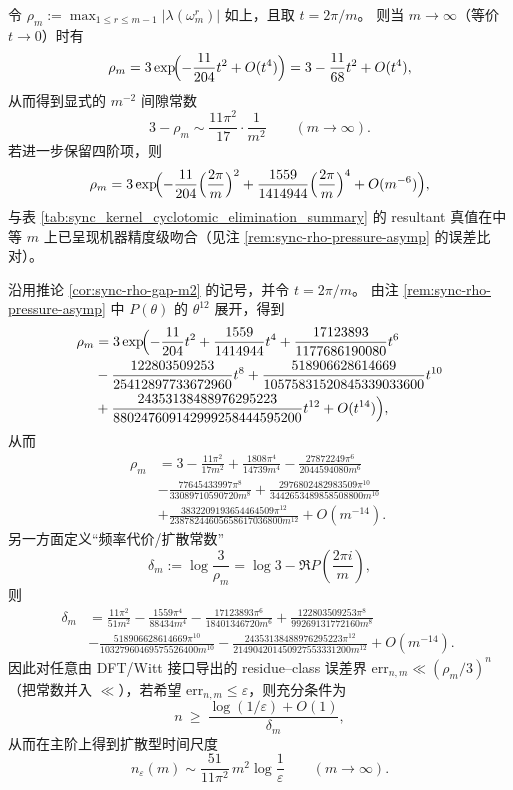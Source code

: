 \begin{corollary}\label{cor:sync-rho-gap-m2}
令 \(\rho_m:=\max_{1\le r\le m-1}|\lambda(\omega_m^r)|\) 如上，且取 \(t=2\pi/m\)。
则当 \(m\to\infty\)（等价 \(t\to 0\)）时有
\[
\rho_m
=3\exp\!\Bigl(-\frac{11}{204}t^2+O(t^4)\Bigr)
=3-\frac{11}{68}t^2+O(t^4),
\]
从而得到显式的 \(m^{-2}\) 间隙常数
\[
\boxed{\;
3-\rho_m\sim \frac{11\pi^2}{17}\cdot\frac{1}{m^2}\qquad(m\to\infty).
\;}
\]
若进一步保留四阶项，则
\[
\rho_m
=3\exp\!\Bigl(-\frac{11}{204}\Bigl(\frac{2\pi}{m}\Bigr)^2+\frac{1559}{1414944}\Bigl(\frac{2\pi}{m}\Bigr)^4+O(m^{-6})\Bigr),
\]
与表 \ref{tab:sync_kernel_cyclotomic_elimination_summary} 的 resultant 真值在中等 \(m\) 上已呈现机器精度级吻合（见注 \ref{rem:sync-rho-pressure-asymp} 的误差比对）。
\end{corollary}

\begin{corollary}\label{cor:sync-rho-gap-m8-diffusive}
沿用推论 \ref{cor:sync-rho-gap-m2} 的记号，并令 \(t=2\pi/m\)。
由注 \ref{rem:sync-rho-pressure-asymp} 中 \(P(\theta)\) 的 \(\theta^{12}\) 展开，得到
\[
\begin{aligned}
\rho_m
&=3\exp\!\Bigl(-\frac{11}{204}t^2+\frac{1559}{1414944}t^4+\frac{17123893}{1177686190080}t^6\\
&-\frac{122803509253}{25412897733672960}t^8+\frac{518906628614669}{10575831520845339033600}t^{10}\\
&+\frac{24353138488976295223}{880247609142999258444595200}t^{12}+O(t^{14})\Bigr),
\end{aligned}
\]
从而
\[
\boxed{\;
\begin{aligned}
\rho_m
&=3-\frac{11\pi^2}{17m^2}
+\frac{1808\pi^4}{14739m^4}
-\frac{27872249\pi^6}{2044594080m^6}\\
&-\frac{77645433997\pi^8}{33089710590720m^8}
+\frac{2976802482983509\pi^{10}}{3442653489858508800m^{10}}\\
&+\frac{3832209193654464509\pi^{12}}{23878244605658617036800m^{12}}
+O(m^{-14}).\;
\end{aligned}\;}
\]
另一方面定义“频率代价/扩散常数”
\[
\delta_m:=\log\frac{3}{\rho_m}=\log 3-\Re P\!\left(\frac{2\pi i}{m}\right),
\]
则
\[
\boxed{\;
\begin{aligned}
\delta_m
&=\frac{11\pi^2}{51m^2}
-\frac{1559\pi^4}{88434m^4}
-\frac{17123893\pi^6}{18401346720m^6}
+\frac{122803509253\pi^8}{99269131772160m^8}\\
&-\frac{518906628614669\pi^{10}}{10327960469575526400m^{10}}
-\frac{24353138488976295223\pi^{12}}{214904201450927553331200m^{12}}
+O(m^{-14}).\;
\end{aligned}\;}
\]
因此对任意由 DFT/Witt 接口导出的 residue--class 误差界
\(
\mathrm{err}_{n,m}\ll (\rho_m/3)^n
\)
（把常数并入 \(\ll\)），若希望 \(\mathrm{err}_{n,m}\le \varepsilon\)，则充分条件为
\[
n\ \ge\ \frac{\log(1/\varepsilon)+O(1)}{\delta_m},
\]
从而在主阶上得到扩散型时间尺度
\[
\boxed{\;
n_\varepsilon(m)\sim \frac{51}{11\pi^2}\,m^2\log\frac{1}{\varepsilon}\qquad(m\to\infty).\;}
\]
\end{corollary}

